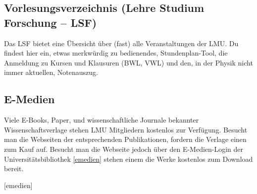 
\begin{urlList}
\end{urlList}

\subsection*{Vorlesungsverzeichnis (Lehre Studium Forschung -- LSF)}

Das LSF bietet eine Übersicht über (fast) alle Veranstaltungen der LMU. Du findest hier ein, etwas merkwürdig zu bedienendes, Stundenplan-Tool, die Anmeldung zu Kursen und Klausuren (BWL, VWL) und den, in der Physik nicht immer aktuellen, Notenauszug.


\begin{urlList}
\end{urlList}


\subsection*{E-Medien}
Viele E-Books, Paper, und wissenschaftliche Journale bekannter Wissenschaftsverlage stehen LMU Mitgliedern kostenlos zur Verfügung.
Besucht man die Webseiten der entsprechenden Publikationen, fordern die Verlage einen zum Kauf auf.
Besucht man die Webseite jedoch über den E-Medien-Login der Universitätsbibliothek \ref{emedien} stehen einem die Werke kostenlos zum Download bereit.
\begin{urlList}
	[emedien]
\end{urlList}

